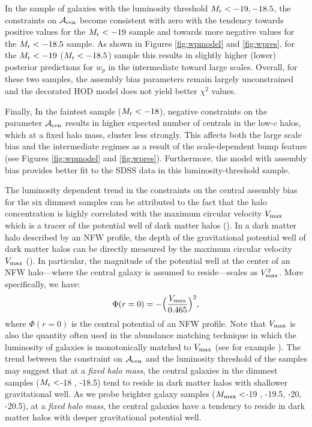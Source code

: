 \documentclass[12pt, preprint]{aastex}
\newcommand{\beq}{\begin{equation}}
\newcommand{\eeq}{\end{equation}}
\newcommand{\acen}{\mathcal{A}_{\rm cen}}
\begin{document}
In the sample of galaxies with the luminosity threshold $M_{\rm r} < -19, -18.5$, the constraints on $\acen$ become consistent with zero with the tendency towards positive values for the $M_{\rm r}<-19$ sample and towards more negative values for the $M_{\rm r }<-18.5$ sample. As shown in Figures \ref{fig:wpmodel} and \ref{fig:wpres}, for the $M_{\rm r}<-19$ ($M_{\rm r}<-18.5$) sample this results in slightly higher (lower) posterior predictions for $w_{p}$ in the intermediate toward large scales. Overall, for these two samples, the assembly bias parameters remain largely unconstrained and the decorated HOD model does not yield better $\chi^{2}$ values. 

Finally, In the faintest sample ($M_{\rm r} < -18$), negative constraints on the parameter $\acen$ results in higher expected number of centrals in the low-$c$ halos, which at a fixed halo mass, cluster less strongly. This affects both the large scale bias and the intermediate regimes as a result of the scale-dependent bump feature (see Figures \ref{fig:wpmodel} and \ref{fig:wpres}). Furthermore, the model with assembly bias provides better fit to the SDSS data in this luminosity-threshold sample. 

The luminosity dependent trend in the constraints on the central assembly bias for the six dimmest samples can be attributed to the fact that the halo concentration is highly correlated with the maximum circular velocity $V_{\rm max}$ which is a tracer of the potential well of dark matter halos (\citealt{prada2012}). In a dark matter halo described by an NFW profile, the depth of the gravitational potential well of dark matter halos can be directly measured by the maximum circular velocity $V_{\rm max}$ (\citealt{vmax_potential}). In particular, the magnitude of the potential well at the center of an NFW halo---where the central galaxy is assumed to reside---scales as $V_{\rm max}^{2}$. More specifically, we have:
\beq
\Phi(r=0) = -\Big(\frac{V_{\rm max}}{0.465}\Big)^{2},
\eeq
 where $\Phi(r=0)$ is the central potential of an NFW profile. Note that $V_{\rm max}$ is also the quantity often used in the abundance matching technique in which the luminosity of galaxies is monotonically matched to $V_{\rm max}$ (see for example \citealt{reddick2013,lehman2015, hod_vs_sham, halodemographic}). The trend between the constraint on $\acen$ and the luminosity threshold of the samples may suggest that at a \emph{fixed} \emph{halo} \emph{mass}, the central galaxies in the dimmest samples ($M_{\rm r}<$-18 , -18.5) tend to reside in dark matter halos with shallower gravitational well. As we probe brighter galaxy samples ($M_{\rm max}<$-19 , -19.5, -20, -20.5), at a \emph{fixed} \emph{halo} \emph{mass}, the central galaxies have a tendency to reside in dark matter halos with deeper gravitational potential well. 
\end{document}
